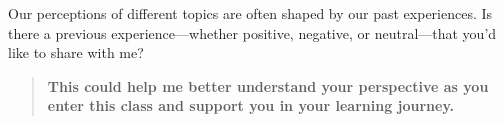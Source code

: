 \documentclass{ximera}
\author{Bart Snapp}
\begin{document}
\begin{question}
    Our perceptions of different topics are often shaped by our past experiences.
    Is there a previous experience---whether positive, negative, or neutral---that
    you'd like to share with me?
    
    
    \begin{quote}
    \textbf{This could help me better understand your
    perspective as you enter this class and support you in your learning journey.}
    \end{quote}
    \begin{freeResponse}
    \end{freeResponse}
\end{question}
\end{document}
